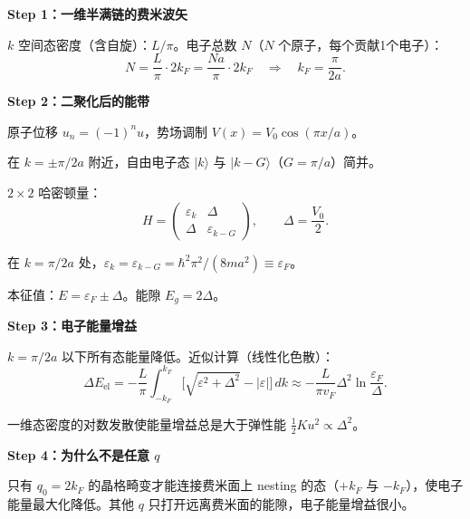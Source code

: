 \begin{derivationbox}
\textbf{Step 1：一维半满链的费米波矢}

$k$ 空间态密度（含自旋）：$L/\pi$。电子总数 $N$（$N$ 个原子，每个贡献1个电子）：
\[
N=\frac{L}{\pi}\cdot 2k_F=\frac{Na}{\pi}\cdot 2k_F\quad\Rightarrow\quad k_F=\frac{\pi}{2a}.
\]

\textbf{Step 2：二聚化后的能带}

原子位移 $u_n=(-1)^n u$，势场调制 $V(x)=V_0\cos(\pi x/a)$。

在 $k=\pm\pi/2a$ 附近，自由电子态 $|k\rangle$ 与 $|k-G\rangle$（$G=\pi/a$）简并。

$2\times2$ 哈密顿量：
\[
H=\begin{pmatrix}\varepsilon_k & \Delta\\ \Delta & \varepsilon_{k-G}\end{pmatrix},
\qquad \Delta=\frac{V_0}{2}.
\]

在 $k=\pi/2a$ 处，$\varepsilon_k=\varepsilon_{k-G}=\hbar^2\pi^2/(8ma^2)\equiv\varepsilon_F$。

本征值：$E=\varepsilon_F\pm\Delta$。能隙 $E_g=2\Delta$。

\textbf{Step 3：电子能量增益}

$k=\pi/2a$ 以下所有态能量降低。近似计算（线性化色散）：
\[
\Delta E_{\text{el}}=-\frac{L}{\pi}\int_{-k_F}^{k_F}\bigl[\sqrt{\varepsilon^2+\Delta^2}-|\varepsilon|\bigr]\,dk
\approx-\frac{L}{\pi v_F}\Delta^2\ln\frac{\varepsilon_F}{\Delta}.
\]

一维态密度的对数发散使能量增益总是大于弹性能 $\frac{1}{2}Ku^2\propto\Delta^2$。

\textbf{Step 4：为什么不是任意 $q$}

只有 $q_0=2k_F$ 的晶格畸变才能连接费米面上 nesting 的态（$+k_F$ 与 $-k_F$），使电子能量最大化降低。其他 $q$ 只打开远离费米面的能隙，电子能量增益很小。
\end{derivationbox}

\vspace{1em}
